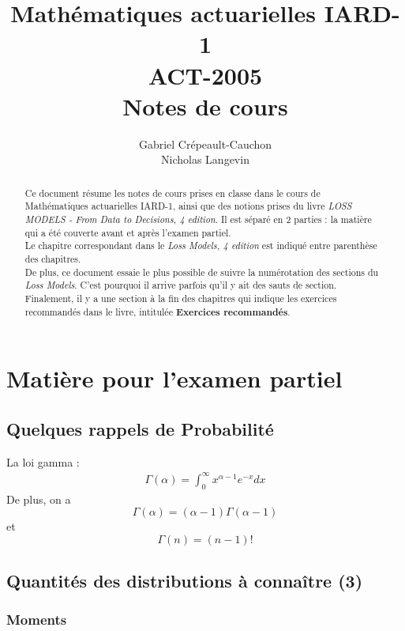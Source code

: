 \documentclass[12pt, french]{report}
\title{Mathématiques actuarielles IARD-1 \\
ACT-2005 \\
Notes de cours}
\author{Gabriel Crépeault-Cauchon \\
Nicholas Langevin}
\begin{document}
\maketitle

\tableofcontents


\begin{abstract}
Ce document résume les notes de cours prises en classe dans le cours de Mathématiques actuarielles IARD-1, ainsi que des notions prises du livre \textit{LOSS MODELS - From Data to Decisions, 4 edition}. Il est séparé en 2 parties : la matière qui a été couverte avant et après l'examen partiel. \\

Le chapitre correspondant dans le \emph{Loss Models, 4 edition} est indiqué entre parenthèse des chapitres. \\

De plus, ce document essaie le plus possible de suivre la numérotation des sections du \emph{Loss Models}. C'est pourquoi il arrive parfois qu'il y ait des sauts de section. \\

Finalement, il y a une section à la fin des chapitres qui indique les exercices recommandés dans le livre, intitulée \textbf{Exercices recommandés}.
\end{abstract}


\part{Matière pour l'examen partiel}

\chapter{Quelques rappels de Probabilité}
La loi gamma : 
\begin{align*}
\Gamma(\alpha) = \int_{0}^{\infty} x^{\alpha-1} e^{-x} dx
\end{align*}
De plus, on a
\[\Gamma(\alpha) = (\alpha-1) \Gamma(\alpha-1)\]
et
\[\Gamma(n) = (n-1)!\]




\chapter{Quantités des distributions à connaître (3)}
\section{Moments}
\end{document}
